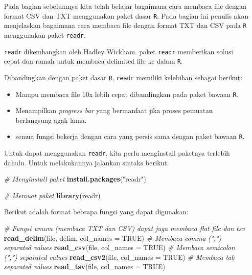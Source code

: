 \documentclass[]{book}
\newenvironment{Shaded}{\begin{snugshade}}{\end{snugshade}}
\newcommand{\KeywordTok}[1]{\textcolor[rgb]{0.13,0.29,0.53}{\textbf{#1}}}
\newcommand{\DataTypeTok}[1]{\textcolor[rgb]{0.13,0.29,0.53}{#1}}
\newcommand{\StringTok}[1]{\textcolor[rgb]{0.31,0.60,0.02}{#1}}
\newcommand{\CommentTok}[1]{\textcolor[rgb]{0.56,0.35,0.01}{\textit{#1}}}
\newcommand{\OtherTok}[1]{\textcolor[rgb]{0.56,0.35,0.01}{#1}}
\newcommand{\NormalTok}[1]{#1}
\providecommand{\tightlist}{%
  \setlength{\itemsep}{0pt}\setlength{\parskip}{0pt}}
\begin{document}
Pada bagian sebelumnya kita telah belajar bagaimana cara membaca file
dengan format CSV dan TXT menggunakan paket dasar \texttt{R}. Pada
bagian ini penulis akan menjelaskan bagaimana cara membaca file dengan
format TXT dan CSV pada \texttt{R} menggunakan paket \texttt{readr}.

\texttt{readr} dikembangkan oleh Hadley Wickham. paket \texttt{readr}
memberikan solusi cepat dan ramah untuk membaca delimited file ke dalam
\texttt{R}.

Dibandingkan dengan paket dasar \texttt{R}, \texttt{readr} memiliki
kelebihan sebagai berikut:

\begin{itemize}
\tightlist
\item
  Mampu membaca file 10x lebih cepat dibandingkan pada paket bawaan
  \texttt{R}.
\item
  Menampilkan \emph{progress bar} yang bermanfaat jika proses pemuatan
  berlangsung agak lama.
\item
  semua fungsi bekerja dengan cara yang persis sama dengan paket bawaan
  \texttt{R}.
\end{itemize}

Untuk dapat menggunakan \texttt{readr}, kita perlu menginstall paketnya
terlebih dahulu. Untuk melakukannya jalankan sintaks berikut:

\begin{Shaded}
\begin{Highlighting}[]
\CommentTok{# Menginstall paket}
\KeywordTok{install.packages}\NormalTok{(}\StringTok{"readr"}\NormalTok{)}

\CommentTok{# Memuat paket}
\KeywordTok{library}\NormalTok{(readr)}
\end{Highlighting}
\end{Shaded}

Berikut adalah format bebrapa fungsi yang dapat digunakan:

\begin{Shaded}
\begin{Highlighting}[]
\CommentTok{# Fungsi umum (membaca TXT dan CSV) dapat juga membaca flat file dan tsv}
\KeywordTok{read_delim}\NormalTok{(file, delim, }\DataTypeTok{col_names =} \OtherTok{TRUE}\NormalTok{)}
\CommentTok{# Membaca comma (",") separated values}
\KeywordTok{read_csv}\NormalTok{(file, }\DataTypeTok{col_names =} \OtherTok{TRUE}\NormalTok{)}
\CommentTok{# Membaca semicolon (";") separated values}
\KeywordTok{read_csv2}\NormalTok{(file, }\DataTypeTok{col_names =} \OtherTok{TRUE}\NormalTok{)}
\CommentTok{# Membaca tab separated values}
\KeywordTok{read_tsv}\NormalTok{(file, }\DataTypeTok{col_names =} \OtherTok{TRUE}\NormalTok{)}
\end{Highlighting}
\end{Shaded}
\end{document}

